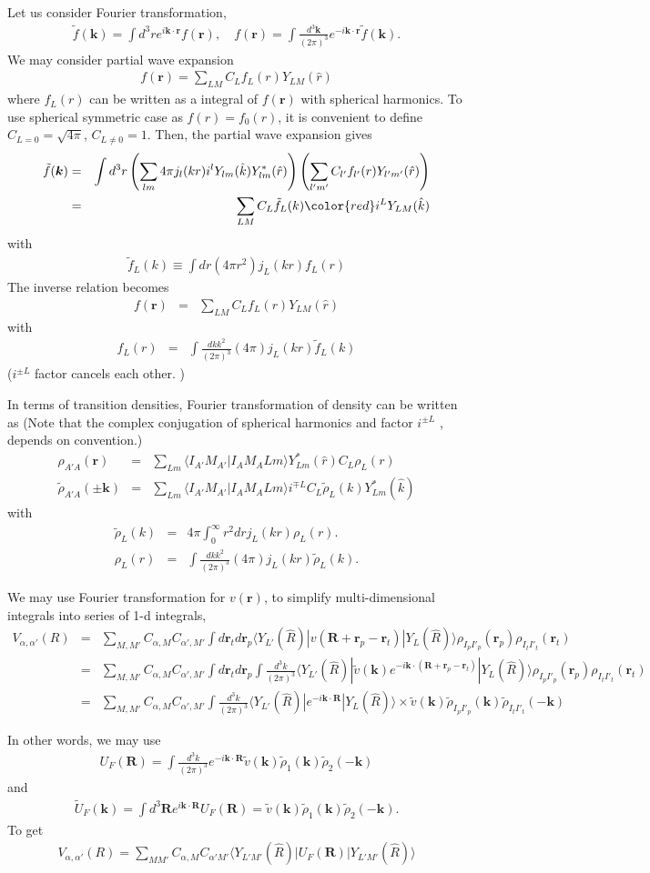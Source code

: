 \documentclass[11pt]{book}
\def\bm{\boldsymbol}
\def\vk{{\bm k}}
\def\vr{{\bm r}}
\def\vR{{\bm R}}
\def\la{\langle}
\def\ra{\rangle}
\newcommand{\bea}{\begin{eqnarray}}
\newcommand{\eea}{\end{eqnarray}}
\newcommand{\no}{\nonumber \\}
\begin{document}
Let us consider Fourier transformation,
\bea 
\tilde{f}(\vk) =\int d^3 r e^{i\vk\cdot\vr} f(\vr),\quad 
f(\vr) = \int \frac{d^3 \vk}{(2\pi)^3} e^{-i\vk\cdot\vr}\tilde{f}(\vk).
\eea 
We may consider partial wave expansion
\bea 
f(\vr) = \sum_{LM} C_L f_{L}(r) Y_{LM}(\hat{r})
\eea 
where $f_L(r)$ can be written as a integral of $f(\vr)$ with spherical harmonics. 
To use spherical symmetric case as $f(r)=f_0(r)$, 
it is convenient to define $C_{L=0}=\sqrt{4\pi}$, $C_{L\neq 0}=1$. 
Then, the partial wave expansion gives 
\bea 
\tilde{f}(\vk) &=& \int d^3 r \left(\sum_{lm} 4\pi j_l(kr) i^l Y_{lm}(\hat{k}) Y^*_{lm}(\hat{r})        \right) \left( \sum_{l' m'} C_{l'} f_{l'}(r) Y_{l'm'}(\hat{r})  \right) \no 
 &=& \sum_{LM} C_L \tilde{f}_L(k) {\color{red} i^L} Y_{LM}(\hat{k})
\eea 
with 
\bea 
\tilde{f}_L(k)\equiv \int dr (4\pi r^2) j_L(kr)   f_L(r)
\eea 
The inverse relation becomes 
\bea 
f(\vr) &=& \sum_{LM} C_L f_L(r) Y_{LM}(\hat{r})           
\eea 
with 
\bea 
f_L(r)&=&\int \frac{dk k^2}{(2\pi)^3} (4\pi)  j_L(kr) \tilde{f}_L(k)
\eea 
($i^{\pm L}$ factor cancels each other. )

In terms of transition densities, Fourier transformation of density can be written as 
(Note that the complex conjugation of spherical harmonics and factor $i^{\pm L}$ ,
depends on convention.)
\bea 
\rho_{A'A}(\vr)&=&\sum_{L m} \la I_{A'} M_{A'}|I_A M_A L m\ra  Y^*_{Lm}(\hat{r}) C_L \rho_L(r) \no 
\tilde{\rho}_{A' A}(\pm\vk)&=&\sum_{L m} \la I_{A'} M_{A'}|I_A M_A L m\ra i^{\mp L} C_L \tilde{\rho}_L (k) Y^*_{Lm}(\hat{k})
\eea 
with 
\bea 
\tilde{\rho}_L(k) &=& 4\pi \int_0^\infty r^2 dr j_L(kr) \rho_L(r). \no 
\rho_L(r) &=& \int \frac{d k k^2}{(2\pi)^3} (4\pi) j_L(kr) \tilde{\rho}_L(k).
\eea 

We may use Fourier transformation for $v(\vr)$, to simplify multi-dimensional
integrals into series of 1-d integrals,  
\bea 
V_{\alpha,\alpha'}(R)&=&\sum_{M,M'} C_{\alpha,M}C_{\alpha',M'} 
\int d{\bm r}_t d{\bm r}_p \la Y_{L'}(\hat{R})| v({\bm R}+\vr_p-\vr_t) |Y_L(\hat{R})\ra
\rho_{I_p I'_p}(\vr_p)\rho_{I_t I'_t}(\vr_t) \no 
&=& \sum_{M,M'} C_{\alpha,M}C_{\alpha',M'} \int d{\bm r}_t d{\bm r}_p
\int \frac{d^3 k}{(2\pi)^{3}} \la Y_{L'}(\hat{R})| \tilde{v}(\vk) e^{-i\vk\cdot(\vR+\vr_p-\vr_t) } |Y_L(\hat{R})\ra \rho_{I_p I'_p}(\vr_p)\rho_{I_t I'_t}(\vr_t) \no 
&=&  \sum_{M,M'} C_{\alpha,M}C_{\alpha',M'}
\int  \frac{d^3 k}{(2\pi)^{3}} \la Y_{L'}(\hat{R})|  e^{-i\vk\cdot \vR } |Y_L(\hat{R})\ra \times 
\tilde{v}(\vk) \tilde{\rho}_{I_p I'_p}(\vk)\tilde{\rho}_{I_t I'_t}(-\vk)
\eea 

In other words, we may use 
\bea 
U_F(\vR)=\int \frac{d^3 k}{(2\pi)^3} e^{-i\vk\cdot\vR} \tilde{v}(\vk)\tilde{\rho}_1(\vk)\tilde{\rho}_2(-\vk)
\eea 
and
\bea 
\tilde{U}_F(\vk)=\int d^3\vR e^{i\vk\cdot\vR} U_F(\vR) = \tilde{v}(\vk)\tilde{\rho}_1(\vk)\tilde{\rho}_2(-\vk).
\eea   
To get 
\bea 
V_{\alpha,\alpha'}(R) = \sum_{MM'} C_{\alpha,M} C_{\alpha'M'} \la Y_{L'M'}(\hat{R})| U_F(\vR)|Y_{L'M'}(\hat{R})\ra 
\eea 
\end{document}
